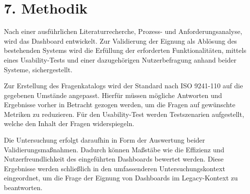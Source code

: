 \section*{7. Methodik}
Nach einer ausführlichen Literaturrecherche, Prozess- und Anforderungsanalyse, wird das Dashboard entwickelt. Zur Validierung der Eignung als Ablösung des bestehenden Systems wird die Erfüllung der erforderten Funktionalitäten, mittels eines Usability-Tests und einer dazugehörigen Nutzerbefragung anhand beider Systeme, sichergestellt.

Zur Erstellung des Fragenkatalogs wird der Standard nach ISO 9241-110 auf die gegebenen Umstände angepasst. Hierfür müssen mögliche Antworten und Ergebnisse vorher in Betracht gezogen werden, um die Fragen auf gewünschte Metriken zu reduzieren. Für den Usability-Test werden Testszenarien aufgestellt, welche den Inhalt der Fragen widerspiegeln.

Die Untersuchung erfolgt daraufhin in Form der Auswertung beider Validierungsmaßnahmen. Dadurch können Maßstäbe wie die Effizienz und Nutzerfreundlichkeit des eingeführten Dashboards bewertet werden. Diese Ergebnisse werden schließlich in den umfassenderen Untersuchungskontext eingeordnet, um die Frage der Eignung von Dashboards im Legacy-Kontext zu beantworten.
